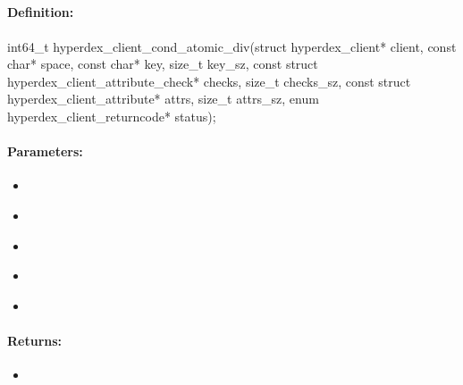 \pagebreak
\subsection{}
\label{api:c:cond_atomic_div}


\paragraph{Definition:}
\begin{ccode}
int64_t hyperdex_client_cond_atomic_div(struct hyperdex_client* client,
        const char* space,
        const char* key, size_t key_sz,
        const struct hyperdex_client_attribute_check* checks, size_t checks_sz,
        const struct hyperdex_client_attribute* attrs, size_t attrs_sz,
        enum hyperdex_client_returncode* status);
\end{ccode}

\paragraph{Parameters:}
\begin{itemize}[noitemsep]
\item {}\\

\item {}\\

\item {}\\

\item {}\\

\item {}\\

\end{itemize}

\paragraph{Returns:}
\begin{itemize}[noitemsep]
\item {}\\

\end{itemize}


